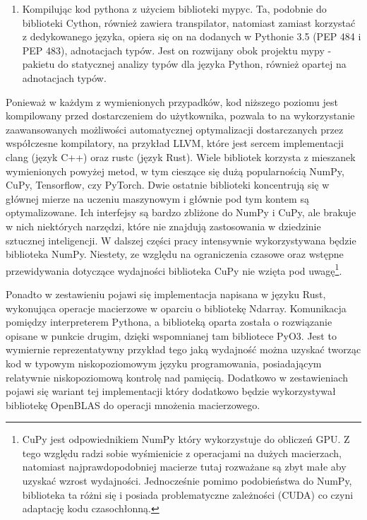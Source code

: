 \documentclass[11pt, a4paper]{article}
\begin{document}
\begin{sloppypar}
\begin{enumerate}
      \item Kompilując kod pythona z użyciem biblioteki mypyc\cite{mypyc}. Ta, podobnie
        do biblioteki Cython, również zawiera transpilator, natomiast zamiast korzystać
        z dedykowanego języka, opiera się on na dodanych w Pythonie 3.5\cite{Python_3_5}
        (PEP 484\cite{PEP_484} i PEP 483\cite{PEP_483}), adnotacjach typów. Jest on
        rozwijany obok projektu mypy - pakietu do statycznej analizy typów dla języka
        Python, również opartej na adnotacjach typów\cite{mypy}.
    \end{enumerate}

    Ponieważ w każdym z wymienionych przypadków, kod niższego poziomu jest kompilowany
    przed dostarczeniem do użytkownika, pozwala to na wykorzystanie zaawansowanych możliwości
    automatycznej optymalizacji dostarczanych przez współczesne kompilatory, na przykład
    LLVM, które jest sercem implementacji clang (język C++) oraz rustc (język Rust).
    Wiele bibliotek korzysta z mieszanek wymienionych powyżej metod, w tym cieszące się dużą
    popularnością NumPy, CuPy, Tensorflow, czy PyTorch. Dwie ostatnie biblioteki koncentrują
    się w głównej mierze na uczeniu maszynowym i głównie pod tym kontem są optymalizowane.
    Ich interfejsy są bardzo zbliżone do NumPy i CuPy, ale brakuje w nich niektórych narzędzi,
    które nie znajdują zastosowania w dziedzinie sztucznej inteligencji. W dalszej części
    pracy intensywnie wykorzystywana będzie biblioteka NumPy. Niestety, ze względu na ograniczenia
    czasowe oraz wstępne przewidywania dotyczące wydajności biblioteka CuPy nie wzięta pod
    uwagę\footnote{CuPy jest odpowiednikiem NumPy który wykorzystuje do obliczeń GPU. Z tego
    względu radzi sobie wyśmienicie z operacjami na dużych macierzach, natomiast
    najprawdopodobniej macierze tutaj rozważane są zbyt małe aby uzyskać wzrost
    wydajności\cite{CPU_VS_GPU}. Jednocześnie pomimo podobieństwa do NumPy, biblioteka ta
    różni się i posiada problematyczne zależności (CUDA) co czyni adaptację kodu czasochłonną.}.

    Ponadto w zestawieniu pojawi się implementacja napisana w języku Rust, wykonująca
    operacje macierzowe w oparciu o bibliotekę Ndarray\cite{Ndarray}. Komunikacja
    pomiędzy interpreterem Pythona, a biblioteką oparta została o rozwiązanie opisane w punkcie
    drugim, dzięki wspomnianej tam bibliotece PyO3\cite{PyO3}. Jest to wymiernie
    reprezentatywny przykład tego jaką wydajność można uzyskać tworząc kod w typowym
    niskopoziomowym języku programowania, posiadającym relatywnie niskopoziomową kontrolę
    nad pamięcią. Dodatkowo w zestawieniach pojawi się wariant tej implementacji który
    dodatkowo będzie wykorzystywał bibliotekę OpenBLAS\cite{OpenBLAS}\cite{Ndarray} do
    operacji mnożenia macierzowego.


\end{sloppypar}
\end{document}
